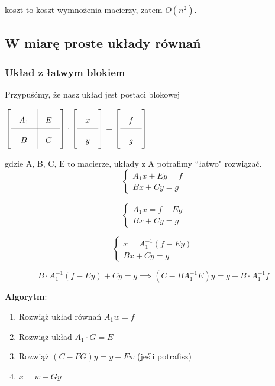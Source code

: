 \documentclass[hidelinks,a4paper,fleqn,oneside]{book}
\begin{document}
koszt to koszt wymnożenia macierzy, zatem  $O(n^2)$.


\subsection{W miarę proste układy równań}

\subsubsection{Układ z łatwym blokiem}

Przypuśćmy, że nasz układ jest postaci blokowej

$\arraycolsep=1em\def\arraystretch{2}
\left[
	\begin{array}{c|c}
		A_1 & E \\ \hline
		B   & C 
	\end{array}
\right] \cdot
\left[
	\begin{array}{c}
		x \\ \hline
		y 
	\end{array}
\right] = 
\left[
	\begin{array}{c}
		f \\ \hline
		g 
	\end{array}
\right]
$

gdzie A, B, C, E to macierze, układy z A potrafimy ``łatwo" rozwiązać.
\[
	\left\{ \begin{array}{l}
	A_1x + Ey = f\\
	Bx + Cy = g
	\end{array} \right.
\]

\[
	\left\{ \begin{array}{l}
	A_1x = f - Ey\\
	Bx + Cy = g
	\end{array} \right.
\]

\[
	\left\{ \begin{array}{l}
	x = A_1^{-1}(f - Ey)\\
	Bx + Cy = g
	\end{array} \right.
\]

\[
	B \cdot A_1^{-1} (f - Ey) + Cy = g \implies (C - BA_1^{-1}E)y = g - B\cdot A_1^{-1}f
\]

\textbf{Algorytm}:

\begin{enumerate}
	\item Rozwiąż układ równań $A_1w = f$
	\item Rozwiąż układ $A_1 \cdot G = E$
	\item Rozwiąż $(C-FG)y = y - Fw$ (jeśli potrafisz)
	\item $x = w - Gy$
\end{enumerate}
\end{document}
